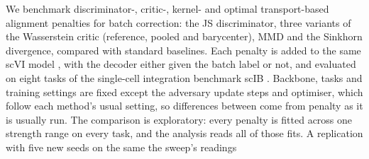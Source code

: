 \documentclass[10pt]{article}
\begin{document}
\qquad We benchmark discriminator-, critic-, kernel- and optimal transport-based alignment penalties for batch correction: the JS discriminator, three variants of the Wasserstein critic (reference, pooled and barycenter), MMD and the Sinkhorn divergence, compared with standard baselines. Each penalty is added to the same scVI model \citep{lopez2018deep}, with the decoder either given the batch label or not, and evaluated on eight tasks of the single-cell integration benchmark scIB \citep{luecken2022benchmarking}. Backbone, tasks and training settings are fixed except the adversary update steps and optimiser, which follow each method's usual setting, so differences between  come from  penalty as it is usually run. The comparison is exploratory: every penalty is fitted across one strength range on every task, and the analysis reads all of those fits. A  replication  with five new  seeds  on the same  the sweep's readings 

\end{document}
